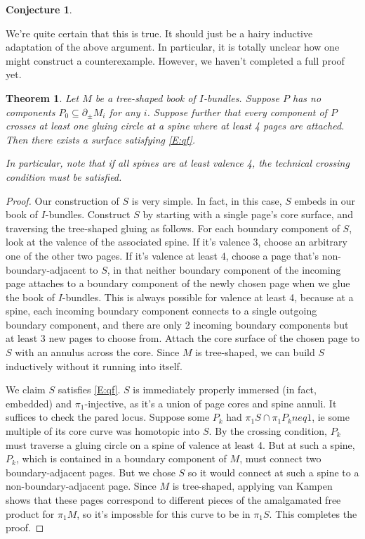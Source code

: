 \documentclass[12pt]{amsart}
\newtheorem{thm}[theorem]{Theorem}
\theoremstyle{definition}
\newtheorem{conj}[theorem]{Conjecture}
\theoremstyle{remark}
\newcommand{\bd}{\partial}
\newcommand{\cin}{\subseteq}
\begin{document}
{\begin{conj}
\end{conj}

We're quite certain that this is true. It should just be a hairy inductive
adaptation of the above argument. In particular, it is totally unclear how one
might construct a counterexample. However, we haven't completed a full proof
yet.

\begin{thm}

Let $M$ be a tree-shaped book of $I$-bundles. Suppose $P$ has no components
$P_0 \cin \bd_\pm M_i$ for any $i$. Suppose further that every
component of $P$ crosses at least one gluing circle at a spine where at least
4 pages are attached. Then there exists a surface satisfying \eqref{E:qf}.

In particular, note that if all spines are at least valence 4, the technical
crossing condition must be satisfied.

\end{thm}
\begin{proof}

Our construction of $S$ is very simple. In fact, in this case, $S$ embeds in
our book of $I$-bundles. Construct $S$ by starting with a single page's core
surface, and traversing the tree-shaped gluing as follows. For each boundary
component of $S$, look at the valence of the associated spine. If it's valence
3, choose an arbitrary one of the other two pages. If it's valence at least 4,
choose a page that's non-boundary-adjacent to $S$, in that neither boundary
component of the incoming page attaches to a boundary component of the newly
chosen page when we glue the book of $I$-bundles. This is always possible for
valence at least 4, because at a spine, each incoming boundary component
connects to a single outgoing boundary component, and there are only 2 incoming
boundary components but at least 3 new pages to choose from. Attach the core
surface of the chosen page to $S$ with an annulus across the core. Since $M$ is
tree-shaped, we can build $S$ inductively without it running into itself.

We claim $S$ satisfies \eqref{E:qf}. $S$ is immediately properly immersed (in
fact, embedded) and $\pi_1$-injective, as it's a union of page cores and spine
annuli. It suffices to check the pared locus. Suppose some $P_k$ had $\pi_1S
\cap \pi_1P_k neq 1$, ie some multiple of its core curve was homotopic into
$S$. By the crossing condition, $P_k$ must traverse a gluing circle on a spine
of valence at least 4.  But at such a spine, $P_k$, which is contained in
a boundary component of $M$, must connect two boundary-adjacent pages. But we
chose $S$ so it would connect at such a spine to a non-boundary-adjacent page.
Since $M$ is tree-shaped, applying van Kampen shows that these pages correspond
to different pieces of the amalgamated free product for $\pi_1M$, so it's
impossble for this curve to be in $\pi_1S$. This completes the proof.


\end{proof}}
\end{document}
